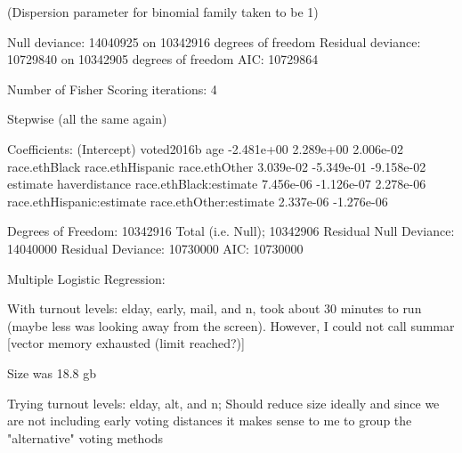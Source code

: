 (Dispersion parameter for binomial family taken to be 1)

    Null deviance: 14040925  on 10342916  degrees of freedom
Residual deviance: 10729840  on 10342905  degrees of freedom
AIC: 10729864

Number of Fisher Scoring iterations: 4



Stepwise (all the same again)

Coefficients:
              (Intercept)                 voted2016b                        age
               -2.481e+00                  2.289e+00                  2.006e-02
            race.ethBlack           race.ethHispanic              race.ethOther
                3.039e-02                 -5.349e-01                 -9.158e-02
                 estimate              haverdistance     race.ethBlack:estimate
                7.456e-06                 -1.126e-07                  2.278e-06
race.ethHispanic:estimate     race.ethOther:estimate
                2.337e-06                 -1.276e-06

Degrees of Freedom: 10342916 Total (i.e. Null);  10342906 Residual
Null Deviance:	    14040000
Residual Deviance: 10730000 	AIC: 10730000




Multiple Logistic Regression:

With turnout levels: elday, early, mail, and n,
took about 30 minutes to run (maybe less was looking away from the screen).
However, I could not call summar [vector memory exhausted (limit reached?)]

Size was 18.8 gb

Trying turnout levels: elday, alt, and n;
Should reduce size ideally and since we are not including early voting distances
it makes sense to me to group the "alternative" voting methods

